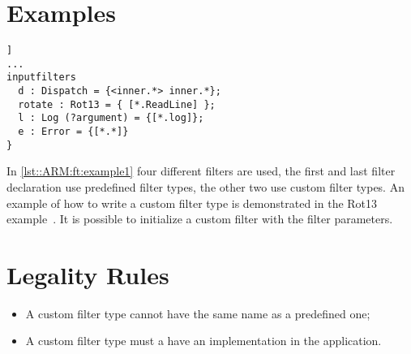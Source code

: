 \section{Examples}
\begin{lstlisting}[caption={Some different filter types },label=lst::ARM:ft:example1,style=listing,language=ComposeStar,float=[tpb]]
...
inputfilters
  d : Dispatch = {<inner.*> inner.*};
  rotate : Rot13 = { [*.ReadLine] };
  l : Log (?argument) = {[*.log]};
  e : Error = {[*.*]}
}
\end{lstlisting}
In \autoref{lst::ARM:ft:example1} four different filters are used, the first and last filter declaration use predefined filter types, the other two use custom filter types. 
An example of how to write a custom filter type is demonstrated in the Rot13 example~\cite{Composestar}.
It is possible to initialize a custom filter with the filter parameters.

\section*{Legality Rules}
\begin{itemize}[noitemsep]
\item A custom filter type cannot have the same name as a predefined one;
\item A custom filter type must a have an implementation in the application.
\end{itemize}

